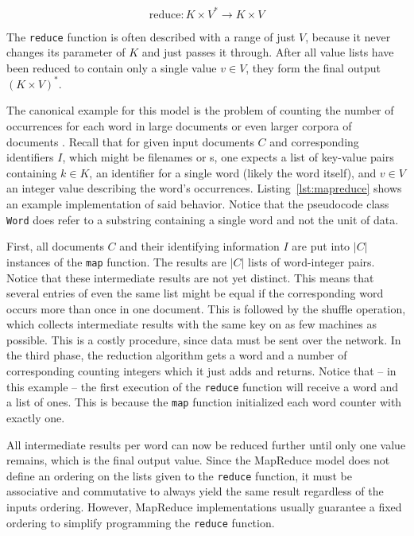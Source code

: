 \[\text{reduce}: K\times{}V^*\rightarrow{}K\times{}V\]

The \lstinline|reduce| function is often described with a range of just $V$, because it never changes its parameter of $K$ and just passes it through. After all value lists have been reduced to contain only a single value $v\in{}V$, they form the final output $(K\times{}V)^*$.

The canonical example for this model is the problem of counting the number of occurrences for each word in large documents or even larger corpora of documents \cite{dean2008mapreduce}. Recall that for given input documents $C$ and corresponding identifiers $I$, which might be filenames or \URL{}s, one expects a list of key-value pairs containing $k\in{}K$, an identifier for a single word (likely the word itself), and $v\in{}V$ an integer value describing the word's occurrences. Listing~\ref{lst:mapreduce} shows an example implementation of said behavior. Notice that the pseudocode class \lstinline|Word| does refer to a substring containing a single word and not the unit of data.

First, all documents $C$ and their identifying information $I$ are put into $|C|$ instances of the \lstinline|map| function. The results are $|C|$ lists of word-integer pairs. Notice that these intermediate results are not yet distinct. This means that several entries of even the same list might be equal if the corresponding word occurs more than once in one document. This is followed by the shuffle operation, which collects intermediate results with the same key on as few machines as possible. This is a costly procedure, since data must be sent over the network. In the third phase, the reduction algorithm gets a word and a number of corresponding counting integers which it just adds and returns. Notice that -- in this example -- the first execution of the \lstinline|reduce| function will receive a word and a list of ones. This is because the \lstinline|map| function initialized each word counter with exactly one.

All intermediate results per word can now be reduced further until only one value remains, which is the final output value. Since the MapReduce model does not define an ordering on the lists given to the \lstinline|reduce| function, it must be associative and commutative to always yield the same result regardless of the inputs ordering. However, MapReduce implementations usually guarantee a fixed ordering to simplify programming the \lstinline|reduce| function.

